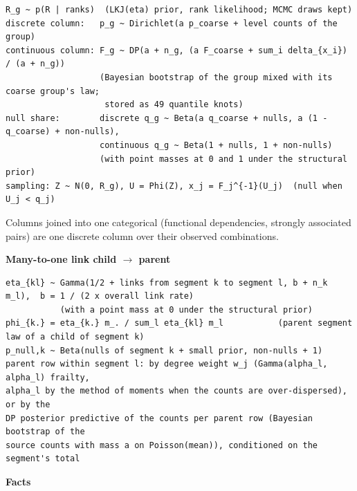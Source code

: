 \documentclass[10pt]{article}
\begin{document}
\begin{verbatim}
R_g ~ p(R | ranks)  (LKJ(eta) prior, rank likelihood; MCMC draws kept)
discrete column:   p_g ~ Dirichlet(a p_coarse + level counts of the group)
continuous column: F_g ~ DP(a + n_g, (a F_coarse + sum_i delta_{x_i}) / (a + n_g))
                   (Bayesian bootstrap of the group mixed with its coarse group's law;
                    stored as 49 quantile knots)
null share:        discrete q_g ~ Beta(a q_coarse + nulls, a (1 - q_coarse) + non-nulls),
                   continuous q_g ~ Beta(1 + nulls, 1 + non-nulls)
                   (with point masses at 0 and 1 under the structural prior)
sampling: Z ~ N(0, R_g), U = Phi(Z), x_j = F_j^{-1}(U_j)  (null when U_j < q_j)
\end{verbatim}
Columns joined into one categorical (functional dependencies, strongly
associated pairs) are one discrete column over their observed combinations.

\textbf{Many-to-one link child $\rightarrow$ parent}

\begin{verbatim}
eta_{kl} ~ Gamma(1/2 + links from segment k to segment l, b + n_k m_l),  b = 1 / (2 x overall link rate)
           (with a point mass at 0 under the structural prior)
phi_{k.} = eta_{k.} m_. / sum_l eta_{kl} m_l           (parent segment law of a child of segment k)
p_null,k ~ Beta(nulls of segment k + small prior, non-nulls + 1)
parent row within segment l: by degree weight w_j (Gamma(alpha_l, alpha_l) frailty,
alpha_l by the method of moments when the counts are over-dispersed), or by the
DP posterior predictive of the counts per parent row (Bayesian bootstrap of the
source counts with mass a on Poisson(mean)), conditioned on the segment's total
\end{verbatim}
\textbf{Facts}
\end{document}
